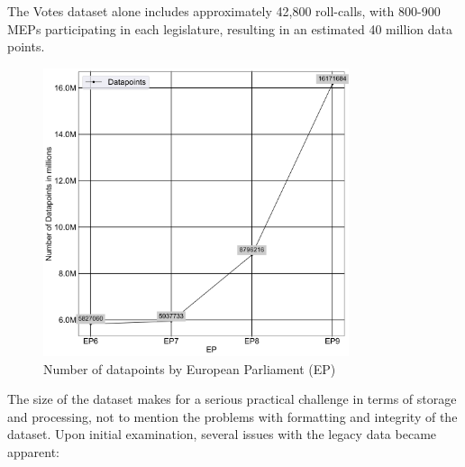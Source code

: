 \documentclass[a4paper,12pt]{report}
\begin{document}
            The Votes dataset alone includes approximately 42,800 roll-calls, with 800-900 MEPs participating in each
            legislature, resulting in an estimated 40 million data points.
            \begin{figure}[htb]
                \centering
                \includegraphics[width=0.8\textwidth]{Graphs/Datapoints}
                \caption{Number of datapoints by European Parliament (EP)}
                \label{fig:Datapoint graph}
            \end{figure}

            The size of the dataset makes for a serious practical challenge in terms of storage and processing, not to
            mention the problems with formatting and integrity of the dataset.
            Upon initial examination, several issues
            with the
            legacy data became apparent:
\end{document}
